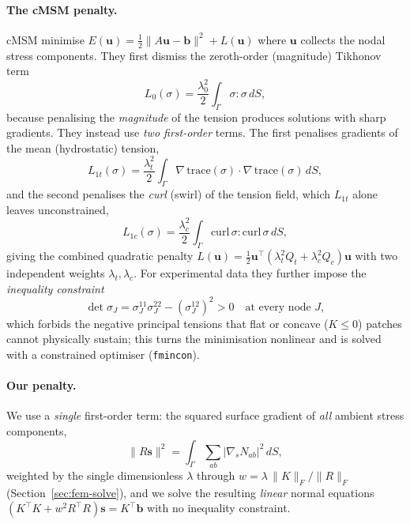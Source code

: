 \documentclass[11pt]{article}
\newcommand{\vv}[1]{\bm{#1}}          %
\begin{document}
\paragraph{The cMSM penalty.}  cMSM minimise
$E(\vv u)=\tfrac12\|A\vv u-\vv b\|^2+L(\vv u)$ where $\vv u$ collects the nodal
stress components.  They first dismiss the zeroth-order (magnitude) Tikhonov term
\begin{equation}
  L_0(\sigma)=\frac{\lambda_0^2}{2}\int_\Gamma \sigma:\sigma\,dS,
  \label{eq:cmsm-L0}
\end{equation}
because penalising the \emph{magnitude} of the tension produces solutions with sharp
gradients.  They instead use \emph{two first-order} terms.  The first penalises
gradients of the mean (hydrostatic) tension,
\begin{equation}
  L_{1t}(\sigma)=\frac{\lambda_t^2}{2}\int_\Gamma
  \nabla\,\mathrm{trace}(\sigma)\cdot\nabla\,\mathrm{trace}(\sigma)\,dS,
  \label{eq:cmsm-L1t}
\end{equation}
and the second penalises the \emph{curl} (swirl) of the tension field, which
$L_{1t}$ alone leaves unconstrained,
\begin{equation}
  L_{1c}(\sigma)=\frac{\lambda_c^2}{2}\int_\Gamma
  \mathrm{curl}\,\sigma:\mathrm{curl}\,\sigma\,dS,
  \label{eq:cmsm-L1c}
\end{equation}
giving the combined quadratic penalty
$L(\vv u)=\tfrac12\vv u^\top(\lambda_t^2 Q_t+\lambda_c^2 Q_c)\vv u$ with two
independent weights $\lambda_t,\lambda_c$.  For experimental data they further impose
the \emph{inequality constraint}
\begin{equation}
  \det\sigma_J=\sigma^{11}_J\sigma^{22}_J-(\sigma^{12}_J)^2>0
  \quad\text{at every node }J,
  \label{eq:cmsm-detpos}
\end{equation}
which forbids the negative principal tensions that flat or concave ($K\le0$) patches
cannot physically sustain; this turns the minimisation nonlinear and is solved with a
constrained optimiser (\texttt{fmincon}).

\paragraph{Our penalty.}  We use a \emph{single} first-order term: the squared surface
gradient of \emph{all} ambient stress components,
\begin{equation}
  \|R\vv s\|^2=\int_\Gamma\sum_{ab}\bigl|\nabla_s N_{ab}\bigr|^2\,dS,
  \label{eq:our-rough}
\end{equation}
weighted by the single dimensionless $\lambda$ through $w=\lambda\,\|K\|_F/\|R\|_F$
(Section~\ref{sec:fem-solve}), and we solve the resulting \emph{linear} normal
equations $(K^\top K+w^2R^\top R)\vv s=K^\top\vv b$ with no inequality constraint.
\end{document}
